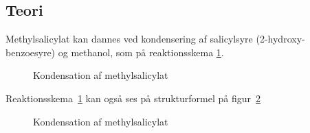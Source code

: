 \subsection*{Teori}\label{Teori}
Methylsalicylat kan dannes ved kondensering af salicylsyre
(2-hydroxy-benzoesyre) og methanol, som på reaktionsskema \ref{fig:rek1}.

\begin{figure}[h]
  \centering
  \caption{Kondensation af methylsalicylat}
  \label{fig:rek1}
\end{figure}

Reaktionsskema~\ref{fig:rek1} kan også ses på strukturformel på
figur~\ref{fig:rek2}

\begin{figure}[h]
  \centering
  \caption{Kondensation af methylsalicylat}
  \label{fig:rek2}
\end{figure}

